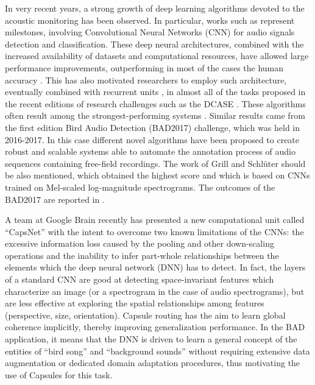 In very recent years, a strong growth of deep learning algorithms devoted to the acoustic monitoring has been observed. In particular, works such as \cite{mcloughlin2015low, piczak2015environmental, salamon2017deep} represent milestones, involving Convolutional Neural Networks (CNN) for audio signals detection and classification.
These deep neural architectures, combined with the increased availability of datasets and computational resources, have allowed large performance improvements, outperforming in most of the cases the human accuracy \cite{sailor2017unsupervised}. This has also motivated researchers to employ such architecture, eventually combined with recurrent units \cite{cakir2017convolutional}, in almost all of the tasks proposed in the recent editions of research challenges such as the DCASE \cite{DCASE2017challenge}. These algorithms often result among the strongest-performing systems \cite{limrare, valenti2017convolutional}.
Similar results came from the first edition Bird Audio Detection (BAD2017) challenge, which was held in 2016-2017. In this case different novel algorithms have been proposed to create robust and scalable systems able to automate the annotation process of audio sequences containing free-field recordings. The work of Grill and Schl\"{u}ter \cite{grill2017two} should be also mentioned, which obtained the highest score and which is based on CNNs trained on Mel-scaled log-magnitude spectrograms. The outcomes of the BAD2017 are reported in \cite{stowell2018automatic}.

A team at Google Brain recently has presented a new computational unit \cite{sabour2017dynamic} called ``CapsNet'' with the intent to overcome two known limitations of the CNNs: the excessive information loss caused by the pooling and other down-scaling operations and the inability to infer part-whole relationships between the elements which the deep neural network (DNN) has to detect. In fact, the layers of a standard CNN are good at detecting space-invariant features which characterize an image (or a spectrogram in the case of audio spectrograms), but are less effective at exploring the spatial relationships among features (perspective, size, orientation). Capsule routing has the aim to learn global coherence implicitly, thereby improving generalization performance. In the BAD application, it means that the DNN is driven to learn a general concept of the entities of ``bird song'' and ``background sounds'' without requiring extensive data augmentation or dedicated domain adaptation procedures, thus motivating the use of Capsules for this task. 

